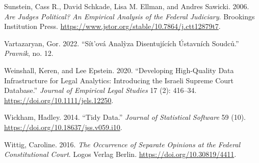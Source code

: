 \documentclass[
  11pt,
]{article}
\newlength{\cslhangindent}
\newenvironment{CSLReferences}[2] %
 {%
  \setlength{\parindent}{0pt}
  \ifodd #1 \everypar{\setlength{\hangindent}{\cslhangindent}}\ignorespaces\fi
  \ifnum #2 > 0
  \setlength{\parskip}{#2\baselineskip}
  \fi
 }%
 {}
\begin{document}
\begin{CSLReferences}{1}{0}
\leavevmode{}%
Sunstein, Cass R., David Schkade, Lisa M. Ellman, and Andres Sawicki.
2006. \emph{Are {Judges Political}? {An Empirical Analysis} of the
{Federal Judiciary}}. {Brookings Institution Press}.
\url{https://www.jstor.org/stable/10.7864/j.ctt12879t7}.

\leavevmode{}%
Vartazaryan, Gor. 2022. {``Sít'ová Analỳza Disentujících Ústavních
Soudců.''} \emph{Pravnik}, no. 12.

\leavevmode{}%
Weinshall, Keren, and Lee Epstein. 2020. {``Developing {High-Quality
Data Infrastructure} for {Legal Analytics}: {Introducing} the {Israeli
Supreme Court Database}.''} \emph{Journal of Empirical Legal Studies} 17
(2): 416--34. \url{https://doi.org/10.1111/jels.12250}.

\leavevmode{}%
Wickham, Hadley. 2014. {``Tidy {Data}.''} \emph{Journal of Statistical
Software} 59 (10). \url{https://doi.org/10.18637/jss.v059.i10}.

\leavevmode{}%
Wittig, Caroline. 2016. \emph{The {Occurrence} of {Separate Opinions} at
the {Federal Constitutional Court}}. {Logos Verlag Berlin}.
\url{https://doi.org/10.30819/4411}.

\end{CSLReferences}
\end{document}
